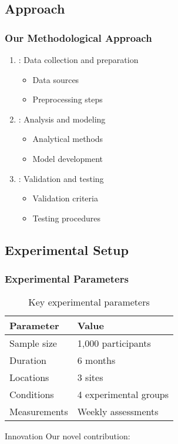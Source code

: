 \subsection{Approach}
\begin{frame}
    \frametitle{Our Methodological Approach}
    \begin{enumerate}
        \item {}: Data collection and preparation
            \begin{itemize}
                \item Data sources
                \item Preprocessing steps
            \end{itemize}
        \item {}: Analysis and modeling
            \begin{itemize}
                \item Analytical methods
                \item Model development
            \end{itemize}
        \item {}: Validation and testing
            \begin{itemize}
                \item Validation criteria
                \item Testing procedures
            \end{itemize}
    \end{enumerate}
\end{frame}

\subsection{Experimental Setup}
\begin{frame}
    \frametitle{Experimental Parameters}
    \begin{table}
        \centering
        \caption{Key experimental parameters}
        \begin{tabular}{ll}
            \toprule
            Parameter & Value \\
            \midrule
            Sample size & 1,000 participants \\
            Duration & 6 months \\
            Locations & 3 sites \\
            Conditions & 4 experimental groups \\
            Measurements & Weekly assessments \\
            \bottomrule
        \end{tabular}
    \end{table}
    
    \vspace{1em}
    \begin{block}{Innovation}
        Our novel contribution: 
    \end{block}
\end{frame}

